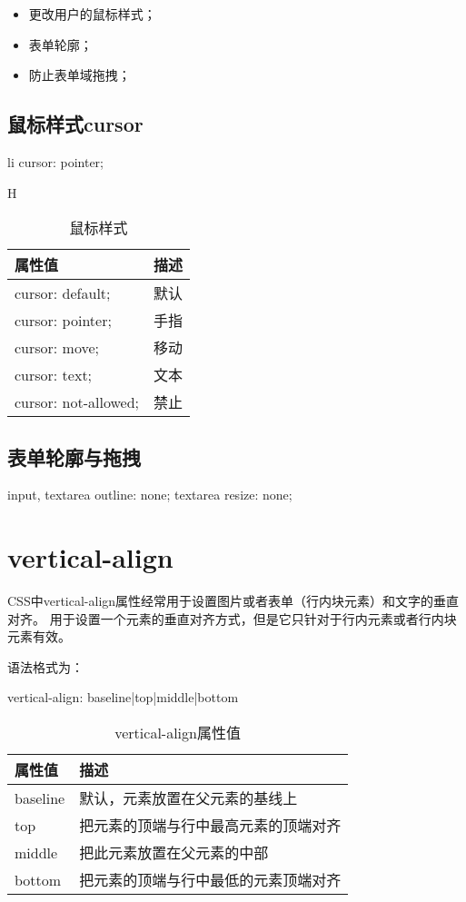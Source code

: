 \begin{itemize}
	\item 更改用户的鼠标样式；
	\item 表单轮廓；
	\item 防止表单域拖拽；
\end{itemize}
\subsection{鼠标样式cursor}
\begin{css}
	li {
	cursor: pointer;
	}
\end{css}
\begin{table}[H]H
	\caption{鼠标样式}
	\centering\begin{tabular}{ll}
		\hline
		属性值                  & 描述 \\
		\hline
		cursor: default;     & 默认 \\
		cursor: pointer;     & 手指 \\
		cursor: move;        & 移动 \\
		cursor: text;        & 文本 \\
		cursor: not-allowed; & 禁止 \\
		\hline
	\end{tabular}

\end{table}
\subsection{表单轮廓与拖拽}
\begin{css}
	input,
	textarea {
			outline: none;
		}
	textarea {
			resize: none;
		}
\end{css}
\section{vertical-align}
CSS中vertical-align属性经常用于设置图片或者表单（行内块元素）和文字的垂直对齐。 用于设置一个元素的垂直对齐方式，但是它只针对于行内元素或者行内块元素有效。

语法格式为：
\begin{css}
	vertical-align: baseline|top|middle|bottom
\end{css}

\begin{table}[H]
	\caption{vertical-align属性值}
	\centering\begin{tabular}{ll}
		\hline
		属性值      & 描述                 \\
		\hline
		baseline & 默认，元素放置在父元素的基线上    \\
		top      & 把元素的顶端与行中最高元素的顶端对齐 \\
		middle   & 把此元素放置在父元素的中部      \\
		bottom   & 把元素的顶端与行中最低的元素顶端对齐 \\
		\hline
	\end{tabular}

\end{table}

